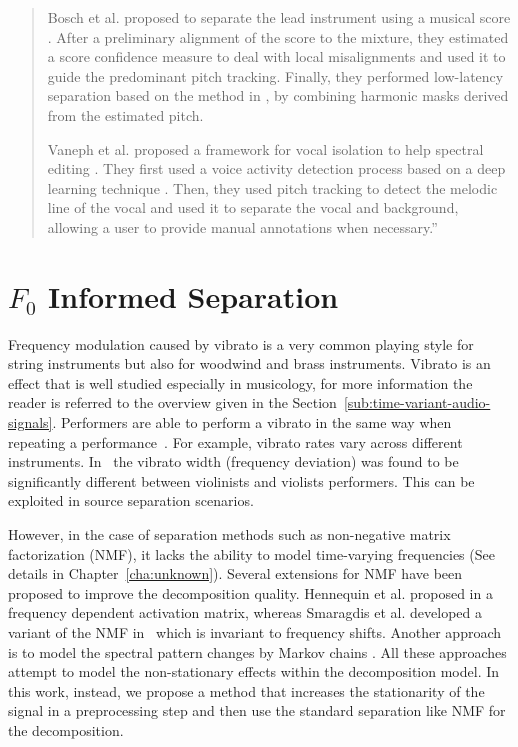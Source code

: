 \begin{quote}
\par
Bosch et al. proposed to separate the lead instrument using a musical score \cite{bosch12}. After a preliminary alignment of the score to the mixture, they estimated a score confidence measure to deal with local misalignments and used it to guide the predominant pitch tracking. Finally, they performed low-latency separation based on the method in \cite{marxer12}, by combining harmonic masks derived from the estimated pitch.
\par
Vaneph et al. proposed a framework for vocal isolation to help spectral editing \cite{vaneph16}. They first used a voice activity detection process based on a deep learning technique \cite{Leglaive15}. Then, they used pitch tracking to detect the melodic line of the vocal and used it to separate the vocal and background, allowing a user to provide manual annotations when necessary.''
\end{quote}

\section{$F_0$ Informed Separation}
\label{sub:frequency_modulation}


Frequency modulation caused by vibrato is a very common playing style for string instruments but also for woodwind and brass instruments.
Vibrato is an effect that is well studied especially in musicology, for more information the reader is referred to the overview given in the Section~\ref{sub:time-variant-audio-signals}.
Performers are able to perform a vibrato in the same way when repeating a performance~\cite{fletcher01}.
For example, vibrato rates vary across different instruments.
In~\cite{macleod06} the vibrato width (frequency deviation) was found to be significantly different between violinists and violists performers.
This can be exploited in source separation scenarios.
\par
However, in the case of separation methods such as non-negative matrix factorization (NMF), it lacks the ability to model time-varying frequencies (See details in Chapter~\ref{cha:unknown}).
Several extensions for NMF have been proposed to improve the decomposition quality.
Hennequin et al. proposed in \cite{hennequin11} a frequency dependent activation matrix, whereas Smaragdis et al. developed a variant of the NMF in~\cite{smaragdis08} which is invariant to frequency shifts.
Another approach is to model the spectral pattern changes by Markov chains \cite{nakano10}. All these approaches attempt to model the non-stationary effects within the decomposition model.
In this work, instead, we propose a method that increases the stationarity of the signal in a preprocessing step and then use the standard separation like NMF for the decomposition.\\

